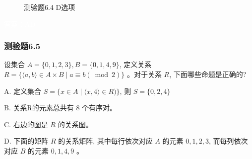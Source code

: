 \documentclass[UTF8, heading=true]{ctexart}
\begin{document}
\begin{figure}[H]
\begin{minipage}[t]{0.3\textwidth}
	      \vspace{-0.5cm}
        \caption{测验题6.4 D选项}
\end{minipage}
\end{figure}

\textcolor{white}{答案：AD}

\subsubsection{测验题6.5}

设集合 $A=\{0,1,2,3\}, B=\{0,1,4,9\}$, 定义关系 $R=\{\langle a, b\rangle \in A \times B \mid a \equiv b(\bmod 2)\}$ 。对于关系 $R$, 下面哪些命题是正确的?

A. 定义集合 $S=\{x \in A \mid\langle x, 4\rangle \in R)\}$, 则 $S=\{0,2,4\}$

B. 关系R的元素总共有 8 个有序对。

C. 右边的图是 $R$ 的关系图。

D. 下面的矩阵 $R$ 的关系矩阵, 其中每行依次对应 $A$ 的元素 $0,1,2,3$, 而每列依次对应 $B$ 的元素 $0,1,4,9$ 。
\end{document}

